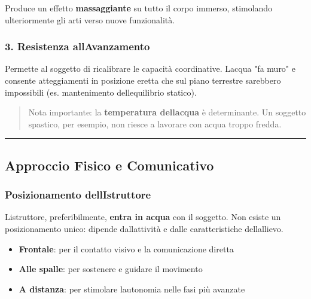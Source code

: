 \documentclass[a4paper,11pt]{article}
\providecommand{\tightlist}{%
  \setlength{\itemsep}{0pt}\setlength{\parskip}{0pt}}
\begin{document}
Produce un effetto \textbf{massaggiante} su tutto il corpo immerso,
stimolando ulteriormente gli arti verso nuove funzionalità.

\subsubsection{3. Resistenza
      all\textquotesingle Avanzamento}\label{resistenza-allavanzamento}

Permette al soggetto di ricalibrare le capacità coordinative.
L\textquotesingle acqua "fa muro" e consente atteggiamenti in posizione
eretta che sul piano terrestre sarebbero impossibili (es. mantenimento
dell\textquotesingle equilibrio statico).

\begin{quote}
      Nota importante: la \textbf{temperatura dell\textquotesingle acqua} è
      determinante. Un soggetto spastico, per esempio, non riesce a lavorare
      con acqua troppo fredda.
\end{quote}

\begin{center}\rule{0.5\linewidth}{0.5pt}\end{center}

\subsection{Approccio Fisico e
      Comunicativo}\label{approccio-fisico-e-comunicativo}

\subsubsection{Posizionamento
      dell\textquotesingle Istruttore}\label{posizionamento-dellistruttore}

L\textquotesingle istruttore, preferibilmente, \textbf{entra in acqua}
con il soggetto. Non esiste un posizionamento unico: dipende
dall\textquotesingle attività e dalle caratteristiche
dell\textquotesingle allievo.

\begin{itemize}
      \tightlist
      \item
            \textbf{Frontale}: per il contatto visivo e la comunicazione diretta
      \item
            \textbf{Alle spalle}: per sostenere e guidare il movimento
      \item
            \textbf{A distanza}: per stimolare l\textquotesingle autonomia nelle
            fasi più avanzate
\end{itemize}
\end{document}
